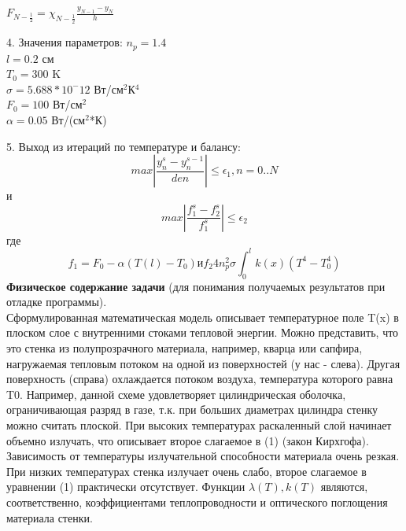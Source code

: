 \documentclass[14pt, a4paper]{extarticle}
\begin{document}
$F_{N- \frac{1}{2}} = \chi_{N-\frac{1}{2}}\frac{y_{N-1} - y_N}{h}$\par
4. Значения параметров:
$n_p=1.4$\\
$l = 0.2$ см\\
$T_0 = 300$ K\\
$\sigma=5.688*10^-12$ Вт/см$^2$К$^4$\\
$F_0 = 100$ Вт/см$^2$\\
$\alpha = 0.05$ Вт/(см$^2$*К)\par
5. Выход из итераций по температуре и балансу:
\begin{equation*}
	max|\frac{y_n^s-y_n^{s-1}}{den}| \leq\epsilon_1, n = 0..N
\end{equation*}
и
\begin{equation*}
	max|\frac{f_1^s - f_2^s}{f_1^s}| \leq\epsilon_2
\end{equation*}
где
\begin{equation*}
	f_1 = F_0 - \alpha(T(l) - T_0) \text{и} f_2 4n_p^2\sigma\int_{0}^{l}k(x)(T^4 - T_0^4)
\end{equation*}
\textbf{Физическое содержание задачи} (для понимания получаемых результатов при отладке программы).\\
Сформулированная математическая модель описывает температурное поле T(x) в плоском слое с внутренними стоками тепловой энергии. Можно представить, что это стенка из полупрозрачного материала, например, кварца или сапфира, нагружаемая тепловым потоком на одной из поверхностей (у нас - слева). Другая поверхность (справа) охлаждается потоком воздуха, температура которого равна T0. Например, данной схеме удовлетворяет цилиндрическая оболочка, ограничивающая разряд в газе, т.к. при больших диаметрах цилиндра стенку можно считать плоской. При высоких температурах раскаленный слой начинает объемно излучать, что описывает второе слагаемое в (1) (закон Кирхгофа). Зависимость от температуры излучательной способности материала очень резкая. При низких температурах стенка излучает очень слабо, второе слагаемое в уравнении (1) практически отсутствует. Функции $\lambda(T), k(T)$ являются, соответственно, коэффициентами теплопроводности и оптического поглощения материала стенки.
\end{document}
